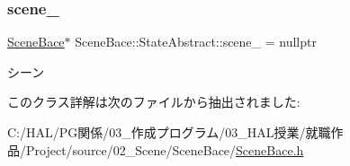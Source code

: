 \subsubsection{\texorpdfstring{scene\+\_\+}{scene\_}}
{\footnotesize\ttfamily \mbox{\hyperlink{class_scene_bace}{Scene\+Bace}}$\ast$ Scene\+Bace\+::\+State\+Abstract\+::scene\+\_\+ = nullptr\hspace{0.3cm}{\ttfamily [protected]}}



シーン 



このクラス詳解は次のファイルから抽出されました\+:\begin{DoxyCompactItemize}
\item 
C\+:/\+H\+A\+L/\+P\+G関係/03\+\_\+作成プログラム/03\+\_\+\+H\+A\+L授業/就職作品/\+Project/source/02\+\_\+\+Scene/\+Scene\+Bace/\mbox{\hyperlink{_scene_bace_8h}{Scene\+Bace.\+h}}\end{DoxyCompactItemize}
